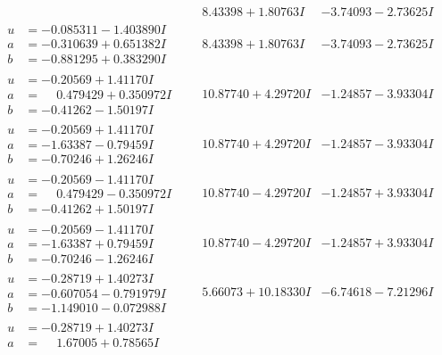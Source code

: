 \documentclass[1p]{elsarticle_modified}
\theoremstyle{definition}
\begin{document}
$$\begin{array}{c|c|c}
 & \phantom{-}8.43398 + 1.80763 I & -3.74093 - 2.73625 I \\ \hline\begin{aligned}
u &= -0.085311 - 1.403890 I \\
a &= -0.310639 + 0.651382 I \\
b &= -0.881295 + 0.383290 I\end{aligned}
 & \phantom{-}8.43398 + 1.80763 I & -3.74093 - 2.73625 I \\ \hline\begin{aligned}
u &= -0.20569 + 1.41170 I \\
a &= \phantom{-}0.479429 + 0.350972 I \\
b &= -0.41262 - 1.50197 I\end{aligned}
 & \phantom{-}10.87740 + 4.29720 I & -1.24857 - 3.93304 I \\ \hline\begin{aligned}
u &= -0.20569 + 1.41170 I \\
a &= -1.63387 - 0.79459 I \\
b &= -0.70246 + 1.26246 I\end{aligned}
 & \phantom{-}10.87740 + 4.29720 I & -1.24857 - 3.93304 I \\ \hline\begin{aligned}
u &= -0.20569 - 1.41170 I \\
a &= \phantom{-}0.479429 - 0.350972 I \\
b &= -0.41262 + 1.50197 I\end{aligned}
 & \phantom{-}10.87740 - 4.29720 I & -1.24857 + 3.93304 I \\ \hline\begin{aligned}
u &= -0.20569 - 1.41170 I \\
a &= -1.63387 + 0.79459 I \\
b &= -0.70246 - 1.26246 I\end{aligned}
 & \phantom{-}10.87740 - 4.29720 I & -1.24857 + 3.93304 I \\ \hline\begin{aligned}
u &= -0.28719 + 1.40273 I \\
a &= -0.607054 - 0.791979 I \\
b &= -1.149010 - 0.072988 I\end{aligned}
 & \phantom{-}5.66073 + 10.18330 I & -6.74618 - 7.21296 I \\ \hline\begin{aligned}
u &= -0.28719 + 1.40273 I \\
a &= \phantom{-}1.67005 + 0.78565 I \\

\end{aligned}
\end{array}$$
\end{document}

